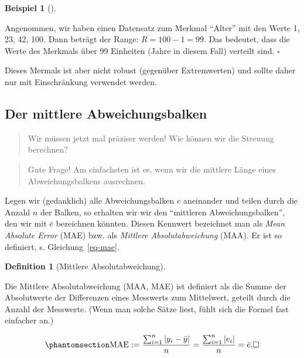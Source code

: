 \documentclass[
  letterpaper,
]{scrbook}
\theoremstyle{definition}
\theoremstyle{definition}
\newtheorem{example}{Beispiel}[chapter]
\theoremstyle{definition}
\newtheorem{definition}{Definition}[chapter]
\theoremstyle{remark}
\begin{document}
\begin{example}[]\protect\hypertarget{exm-range}{}\label{exm-range}

Angenommen, wir haben einen Datensatz zum Merkmal \enquote{Alter} mit
den Werte 1, 23, 42, 100. Dann beträgt der Range: \(R = 100 - 1 = 99\).
Das bedeutet, dass die Werte des Merkmals über 99 Einheiten (Jahre in
diesem Fall) verteilt sind. \(\square\)

\end{example}

Dieses Mermals ist aber nicht robust (gegenüber Extremwerten) und sollte
daher nur mit Einschränkung verwendet werden.

\subsection{Der mittlere
Abweichungsbalken}\label{der-mittlere-abweichungsbalken}

\begin{quote}
{} Wir müssen jetzt mal präziser werden! Wie können wir
die Streuung berechnen?
\end{quote}

\begin{quote}
{} Gute Frage! Am einfachsten ist es, wenn wir die
mittlere Länge eines Abweichungsbalkens ausrechnen.
\end{quote}

Legen wir (gedanklich) alle Abweichungsbalken \(e\) aneinander und
teilen durch die Anzahl \(n\) der Balken, so erhalten wir wir den
\enquote{mittleren Abweichungsbalken}, den wir mit \(\bar{e}\)
bezeichnen könnten. Diesen Kennwert bezeichnet man als \emph{Mean
Absolute Error} (MAE) bzw. als \emph{Mittlere Absolutabweichung} (MAA).
Er ist so definiert, s. Gleichung~\ref{eq-mae}.

\begin{definition}[Mittlere
Absolutabweichung]\protect\hypertarget{def-mae}{}\label{def-mae}

Die Mittlere Absolutabweichung (MAA, MAE) ist definiert als die Summe
der Absolutwerte der Differenzen eines Messwerts zum Mittelwert, geteilt
durch die Anzahl der Messwerte. (Wenn man solche Sätze liest, fühlt sich
die Formel fast einfacher an.)

\begin{equation}\phantomsection\label{eq-mae}{{\displaystyle \mathrm {MAE} :={\frac {\sum _{i=1}^{n}\left|y_{i}-\bar{y}\right|}{n}}={\frac {\sum _{i=1}^{n}\left|e_{i}\right|}{n}}=\bar{e}. \square}}\end{equation}

\end{definition}
\end{document}
